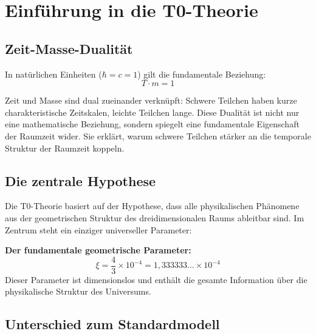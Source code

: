 	
	\section{Einführung in die T0-Theorie}
	
	\subsection{Zeit-Masse-Dualität}
	
	In natürlichen Einheiten ($\hbar = c = 1$) gilt die fundamentale Beziehung:
	\begin{equation}
		T \cdot m = 1
		\label{eq:time_mass_duality}
	\end{equation}
	
	Zeit und Masse sind dual zueinander verknüpft: Schwere Teilchen haben kurze charakteristische Zeitskalen, leichte Teilchen lange. Diese Dualität ist nicht nur eine mathematische Beziehung, sondern spiegelt eine fundamentale Eigenschaft der Raumzeit wider. Sie erklärt, warum schwere Teilchen stärker an die temporale Struktur der Raumzeit koppeln.
	
	\subsection{Die zentrale Hypothese}
	
	Die T0-Theorie basiert auf der Hypothese, dass alle physikalischen Phänomene aus der geometrischen Struktur des dreidimensionalen Raums ableitbar sind. Im Zentrum steht ein einziger universeller Parameter:
	
	\begin{foundation}
		\textbf{Der fundamentale geometrische Parameter:}
		\begin{equation}
			\boxed{\xi = \frac{4}{3} \times 10^{-4} = 1{,}333333\dots \times 10^{-4}}
			\label{eq:xi_fundamental}
		\end{equation}
		Dieser Parameter ist dimensionslos und enthält die gesamte Information über die physikalische Struktur des Universums.
	\end{foundation}
	
	\subsection{Unterschied zum Standardmodell}
	
